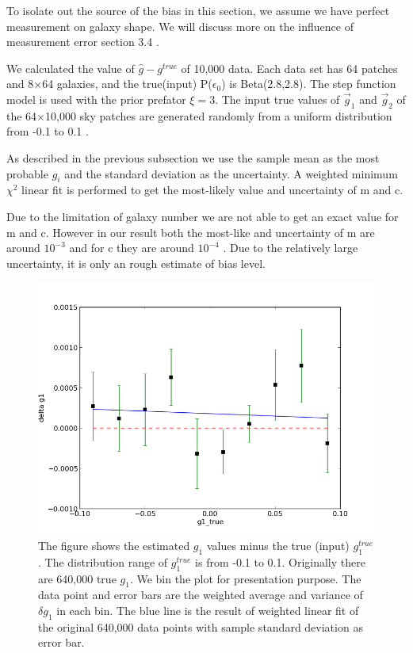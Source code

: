 \documentclass[useAMS,usenatbib]{mn2e}
\begin{document}
To isolate out the source of the bias in this section, we assume we have perfect measurement on galaxy shape.
We will discuss more on the influence of measurement error section 3.4 .

We calculated the value of $\hat{g}-g^{true}$ of 10,000 data. Each data set has 64 patches and 8$\times$64 galaxies, and
the true(input) P($\epsilon_{0}$) is Beta(2.8,2.8). The step function model is used with the prior prefator $\xi=3$.
The input true values of $\vec{g}_{1}$ and $\vec{g}_{2}$ of the 64$\times$10,000 sky patches are generated randomly from a uniform distribution from -0.1 to 0.1 . 

As described in the previous subsection we use the sample mean as the most probable $g_{i}$ and 
the standard deviation as the uncertainty. A weighted minimum $\chi^{2}$ linear fit is performed to get the
most-likely value and uncertainty of m and c.
 
Due to the limitation of galaxy number we are not able to get an exact value for m and c. However in our result 
both the most-like and uncertainty of m are around $10^{-3}$ and for c they are around $10^{-4}$ . Due to the
relatively large uncertainty, it is only an rough estimate of bias level.
\begin{figure}
\includegraphics[scale=0.5]{fig/g1bias}

\caption{The figure shows the estimated $g_{1}$ values minus the true (input)
$g_{1}^{true}$. The distribution range of $g_{1}^{true}$ is from
-0.1 to 0.1. Originally there are 640,000 true $g_{1}$. We bin the
plot for presentation purpose. The data point and error bars are the weighted
 average and  variance of $\delta g_{1}$ in each bin. The blue
line is the result of weighted linear fit of the original 640,000 data points
with sample standard deviation as error bar.}
\end{figure}
\end{document}
